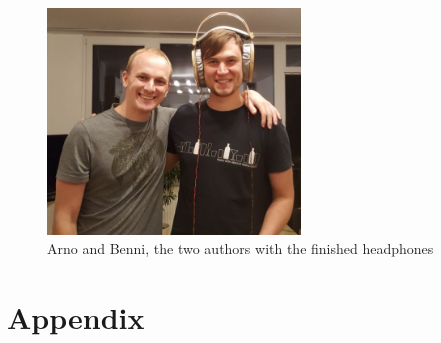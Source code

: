\documentclass{article}
\begin{document}
\begin{figure}[htb]
    \centering
    \includegraphics[width=0.6\textwidth]{images/arno_and_benni.jpg}
    \caption{Arno and Benni, the two authors with the finished headphones}
    \label{f:collab}
\end{figure}

\section{Appendix}
\label{s:app}
\end{document}
